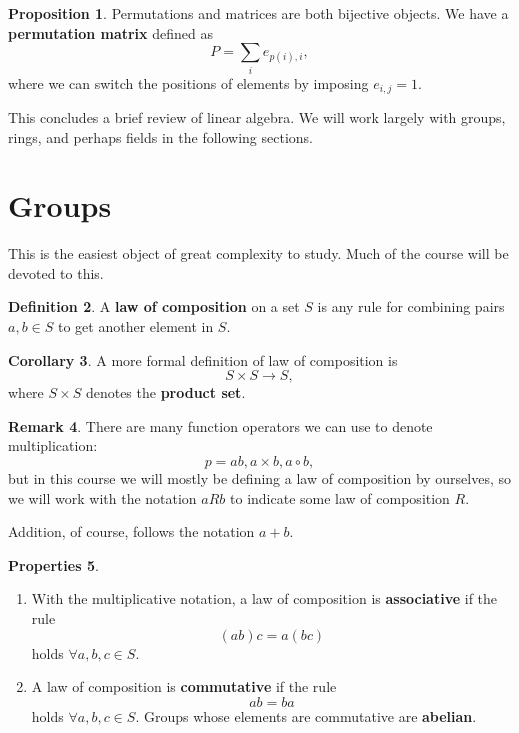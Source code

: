 \documentclass[11pt]{amsart} %
\theoremstyle{definition}
\newtheorem{definition}{Definition}[section]
\newtheorem{proposition}[definition]{Proposition}
\newtheorem{corollary}[definition]{Corollary}
\newtheorem{properties}[definition]{Properties}
\theoremstyle{definition}
\newtheorem{remark}[definition]{Remark}
\numberwithin{equation}{section}
\begin{document}
\begin{proposition}
	Permutations and matrices are both bijective objects. We have a \textbf{permutation matrix} defined as 
	$$ P = \sum_i e_{p(i), i}, $$
	where we can switch the positions of elements by imposing $e_{i,j}=1$.
\end{proposition}

This concludes a brief review of linear algebra. We will work largely with groups, rings, and perhaps fields in the following sections.


\section{Groups}

This is the easiest object of great complexity to study. Much of the course will be devoted to this.

\begin{definition}
	A \textbf{law of composition} on a set $S$ is any rule for combining pairs $a,b \in S$ to get another element in $S$.
\end{definition}

\begin{corollary}
	A more formal definition of law of composition is
	$$S \times S \to S, $$
	where $S \times S $ denotes the \textbf{product set}.
\end{corollary}

\begin{remark}
	There are many function operators we can use to denote multiplication:
	$$p=ab,a \times b, a \circ b,$$
	but in this course we will mostly be defining a law of composition by ourselves, so we will work with the notation $ a R b$ to indicate some law of composition $R$.
	
	Addition, of course, follows the notation $a+b$. 
\end{remark}

\begin{properties}
	\begin{enumerate}[noitemsep]
		\item With the multiplicative notation, a law of composition is \textbf{associative} if the rule
		$$(ab)c = a(bc) $$
		holds $\forall a,b,c \in S$.
		
		\item A law of composition is \textbf{commutative} if the rule
		$$ab=ba$$
		holds $\forall a,b,c \in S$. Groups whose elements are commutative are \textbf{abelian}.
	\end{enumerate}
\end{properties}
\end{document}
